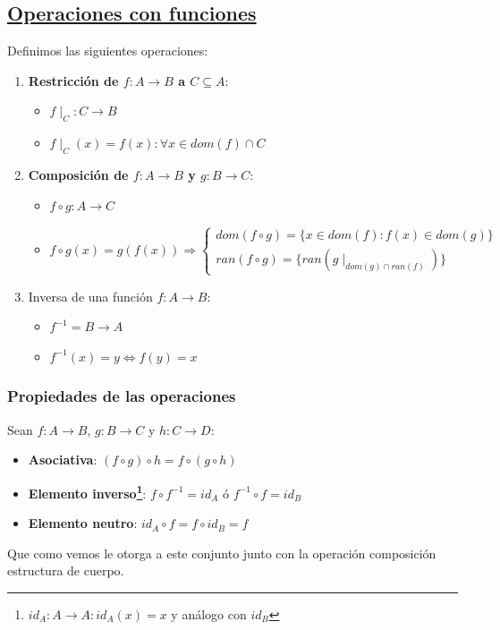 \documentclass[10pt,a4paper,openright]{book}
\begin{document}
\subsection*{\underline{Operaciones con funciones}}
Definimos las siguientes operaciones:
\begin{enumerate}
\item \textbf{Restricción de $f:A\rightarrow B$ a $C\subseteq A$}:
\begin{itemize}
\item $f\mid_C: C\rightarrow B$
\item $f\mid_C(x)=f(x): \forall x\in dom(f)\cap C$
\end{itemize}

\item \textbf{Composición de $f:A\rightarrow B$ y $g:B\rightarrow C$}:
\begin{itemize}
\item $f\circ g: A\rightarrow C$
\item $f\circ g(x)=g(f(x))\Rightarrow \begin{cases}dom(f\circ g)=\{x\in dom(f): f(x)\in dom(g)\}\\ ran(f\circ g)=\{ran(g\mid_{dom(g)\cap ran(f)})\}\end{cases}$
\end{itemize}

\item Inversa de una función $f: A\rightarrow B$:
\begin{itemize}
\item $f^{-1}=B\rightarrow A$
\item $f^{-1}(x)=y\Leftrightarrow f(y)=x$
\end{itemize}
\end{enumerate}

\subsubsection*{Propiedades de las operaciones}
Sean $f:A\rightarrow B$, $g: B\rightarrow C$ y $h:C\rightarrow D$:
\begin{itemize}
\item \textbf{Asociativa}: $(f\circ g)\circ h=f\circ(g\circ h)$
\item \textbf{Elemento inverso\footnote{$id_A: A\longrightarrow A: id_A(x)=x$ y análogo con $id_B$}}: $f\circ f^{-1}=id_A$ ó $ f^{-1}\circ f=id_B$
\item \textbf{Elemento neutro}: $id_A\circ f=f\circ id_B=f$
\end{itemize}
Que como vemos le otorga a este conjunto junto con la operación composición estructura de cuerpo.
\end{document}
